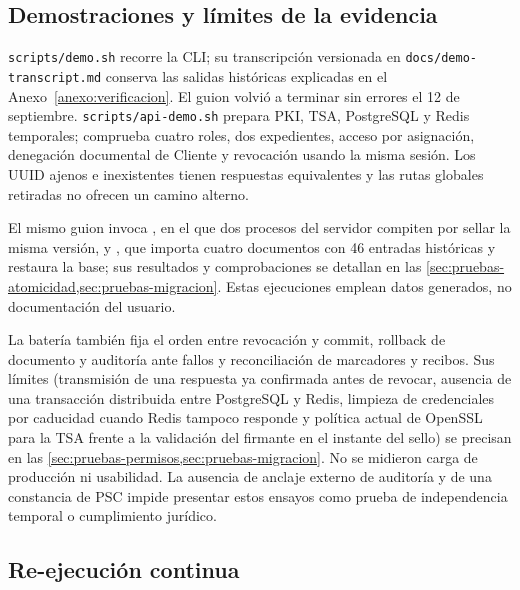 \subsection{Demostraciones y límites de la evidencia}\label{sec:matriz-demo}

\texttt{scripts/demo.sh} recorre la CLI; su transcripción versionada en \texttt{docs/demo-transcript.md} conserva las salidas históricas explicadas en el Anexo~\ref{anexo:verificacion}. El guion volvió a terminar sin errores el 12 de septiembre. \texttt{scripts/api-demo.sh} prepara PKI, TSA, PostgreSQL y Redis temporales; comprueba cuatro roles, dos expedientes, acceso por asignación, denegación documental de Cliente y revocación usando la misma sesión. Los UUID ajenos e inexistentes tienen respuestas equivalentes y las rutas globales retiradas no ofrecen un camino alterno.

El mismo guion invoca , en el que dos procesos del servidor compiten por sellar la misma versión, y , que importa cuatro documentos con 46 entradas históricas y restaura la base; sus resultados y comprobaciones se detallan en las \cref{sec:pruebas-atomicidad,sec:pruebas-migracion}. Estas ejecuciones emplean datos generados, no documentación del usuario.

La batería también fija el orden entre revocación y commit, rollback de documento y auditoría ante fallos y reconciliación de marcadores y recibos. Sus límites (transmisión de una respuesta ya confirmada antes de revocar, ausencia de una transacción distribuida entre PostgreSQL y Redis, limpieza de credenciales por caducidad cuando Redis tampoco responde y política actual de OpenSSL para la TSA frente a la validación del firmante en el instante del sello) se precisan en las \cref{sec:pruebas-permisos,sec:pruebas-migracion}. No se midieron carga de producción ni usabilidad. La ausencia de anclaje externo de auditoría y de una constancia de PSC impide presentar estos ensayos como prueba de independencia temporal o cumplimiento jurídico.

\subsection{Re-ejecución continua}\label{sec:matriz-ci}

